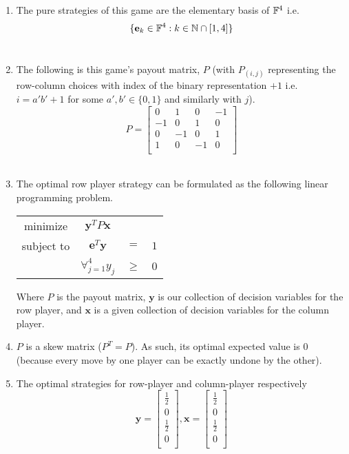 \documentclass[12pt,oneside]{amsart}
\numberwithin{equation}{section}
\numberwithin{figure}{section}
\theoremstyle{plain}
\theoremstyle{definition}
\newcommand{\N}{\ensuremath \mathbb{N}}
\newcommand{\F}{\ensuremath \mathbb{F}}
\begin{document}
\begin{enumerate}
  \item The pure strategies of this game are the elementary basis of $\F^4$ i.e. \\ 
    \[\{\mathbf{e}_k \in \F^4 : k \in \N \cap [1,4]\}\] \\
  \item The following is this game's payout matrix, $P$ (with $P_{(i,j)}$ 
    representing the row-column choices with index of the binary representation 
    $+ 1$ i.e. $i = a'b' + 1$ for some $a',b' \in \{0,1\}$ and similarly with 
    $j$). \\
    \[P = \begin{bmatrix}
      0  & 1  & 0  & -1 \\
      -1 & 0  & 1  & 0  \\
      0  & -1 & 0  & 1  \\
      1  & 0  & -1 & 0  \\
    \end{bmatrix}\] \\ \pagebreak
  \item The optimal row player strategy can be formulated as the following linear 
    programming problem. \\
    \begin{center}\begin{tabular}{cccc}
      minimize   & $\mathbf{y}^TP\mathbf{x}$ &        &     \\
      subject to & $\mathbf{e}^T\mathbf{y}$  & $=$    & $1$ \\
                 & $\forall_{j=1}^{4} y_j$   & $\geq$ & $0$ \\
    \end{tabular}\end{center}
    Where $P$ is the payout matrix, $\mathbf{y}$ is our collection of decision 
    variables for the row player, and $\mathbf{x}$ is a given collection of 
    decision variables for the column player. \\
  \item $P$ is a skew matrix ($P^T = P$). As such, its optimal expected value is 
    $0$ (because every move by one player can be exactly undone by the other). \\
  \item The optimal strategies for row-player and column-player respectively \\
    \[\mathbf{y} = \begin{bmatrix}
      \frac{1}{2} \\
      0           \\
      \frac{1}{2} \\
      0           \\
    \end{bmatrix},\mathbf{x} = \begin{bmatrix}
      \frac{1}{2} \\
      0           \\
      \frac{1}{2} \\
      0           \\
    \end{bmatrix}\] \\
\end{enumerate}
\end{document}
